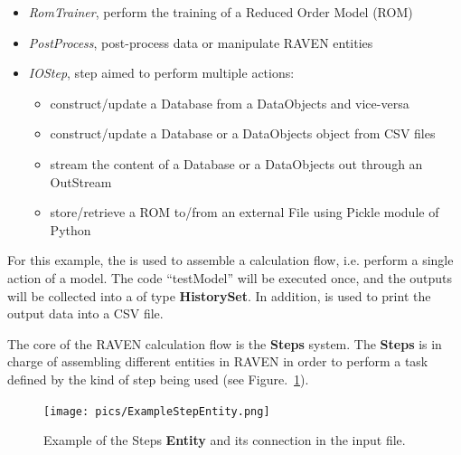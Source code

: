 \begin{enumerate}
\begin{itemize}
        \item \textit{RomTrainer}, perform the training of a Reduced Order Model (ROM)
        \item \textit{PostProcess}, post-process data or manipulate RAVEN entities
        \item \textit{IOStep}, step aimed to perform multiple actions:
        \begin{itemize}
          \item construct/update a Database from a DataObjects and vice-versa
          \item construct/update a Database or a DataObjects object from CSV files
          \item stream the content of a Database or a DataObjects out through an OutStream
          \item store/retrieve a ROM to/from an external File using Pickle module of Python
        \end{itemize}
      \end{itemize}
      For this example, the  is used to assemble a calculation flow, i.e. perform a single action
      of a model.
      The code ``testModel'' will be executed once, and the outputs will be collected into a 
      of type \textbf{HistorySet}. In addition,  is used to print the output data into a CSV file.
\end{enumerate}

The core of the RAVEN calculation flow is the \textbf{Steps} system. The \textbf{Steps} is in charge of assembling
different entities in RAVEN in order to perform a task defined by the kind of step being used
(see Figure.~\ref{fig:ExampleStepEntity}).

\begin{figure}[h!]
  \texttt{[image: pics/ExampleStepEntity.png]}
  \caption{Example of the Steps \textbf{Entity}  and its connection in the input file.}
  \label{fig:ExampleStepEntity}
\end{figure}


